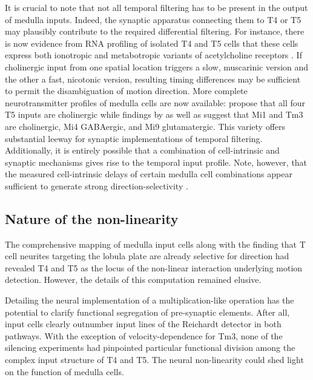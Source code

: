 It is crucial to note that not all temporal filtering has to be present in the output of medulla inputs. Indeed, the synaptic apparatus connecting them to T4 or T5 may plausibly contribute to the required differential filtering. For instance, there is now evidence from RNA profiling of isolated T4 and T5 cells that these cells express both ionotropic and metabotropic variants of acetylcholine receptors \citep{Shinomiya:2014dx,Pankova:2016aa}. If cholinergic input from one spatial location triggers a slow, muscarinic version and the other a fast, nicotonic version, resulting timing differences may be sufficient to permit the disambiguation of motion direction. More complete neurotransmitter profiles of medulla cells are now available: \citet{Shinomiya:2014dx} propose that all four T5 inputs are cholinergic while findings by \citet{Pankova:2017aa} as well as \citet{Takemura:2017aa} suggest that Mi1 and Tm3 are cholinergic, Mi4 GABAergic, and Mi9 glutamatergic. This variety offers substantial leeway for synaptic implementations of temporal filtering. Additionally, it is entirely possible that a combination of cell-intrinsic and synaptic mechanisms gives rise to the temporal input profile. Note, however, that the measured cell-intrinsic delays of certain medulla cell combinations appear sufficient to generate strong direction-selectivity \citep{Arenz:2017aa}.

\subsection{Nature of the non-linearity}
The comprehensive mapping of medulla input cells along with the finding that T cell neurites targeting the lobula plate are already selective for direction had revealed T4 and T5 as the locus of the non-linear interaction underlying motion detection. However, the details of this computation remained elusive.

Detailing the neural implementation of a multiplication-like operation has the potential to clarify functional segregation of pre-synaptic elements. After all, input cells clearly outnumber input lines of the Reichardt detector in both pathways. With the exception of velocity-dependence for Tm3, none of the silencing experiments had pinpointed particular functional division among the complex input structure of T4 and T5. The neural non-linearity could shed light on the function of medulla cells.

